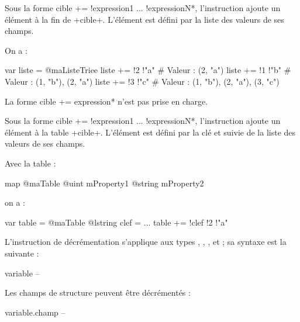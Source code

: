 Sous la forme \ggs*cible += !expression1 ... !expressionN*, l'instruction ajoute un élément à la fin de \ggs+cible+. L'élément est défini par la liste des valeurs de ses champs.


On a :

\begin{galgas}
var liste = @maListeTriee {}
liste += !2 !"a" # Valeur : (2, "a")
liste += !1 !"b" # Valeur : (1, "b"), (2, "a")
liste += !3 !"c" # Valeur : (1, "b"), (2, "a"), (3, "c")
\end{galgas}








La forme \ggs*cible += expression* n'est pas prise en charge.

Sous la forme \ggs*cible += !expression1 ... !expressionN*, l'instruction ajoute un élément à la table \ggs+cible+. L'élément est défini par la clé et suivie de la liste des valeurs de ses champs.


Avec la table :
\begin{galgas}
map @maTable {
  @uint mProperty1
  @string mProperty2
}
\end{galgas}

on a :

\begin{galgas}
var table = @maTable {}
@lstring clef = ...
table += !clef !2 !"a"
\end{galgas}















L'instruction de décrémentation s'applique aux types , , ,  et  ; sa syntaxe est la suivante :

\begin{galgasbox}
variable --
\end{galgasbox}

Les champs de structure peuvent être décrémentés :
\begin{galgasbox}
variable.champ --
\end{galgasbox}

